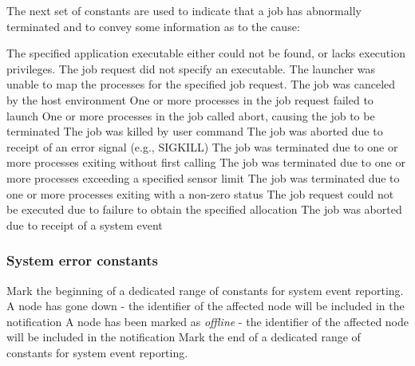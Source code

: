 The next set of constants are used to indicate that a job has abnormally terminated and to convey some information as to the cause:

\begin{constantdesc}

%
The specified application executable either could not be found, or lacks execution privileges.
%
The job request did not specify an executable.
%
The launcher was unable to map the processes for the specified job request.
%
The job was canceled by the host environment
%
One or more processes in the job request failed to launch
%
One or more processes in the job called abort, causing the job to be terminated
%
The job was killed by user command
%
The job was aborted due to receipt of an error signal (e.g., SIGKILL)
%
The job was terminated due to one or more processes exiting without first calling 
%
The job was terminated due to one or more processes exceeding a specified sensor limit
%
The job was terminated due to one or more processes exiting with a non-zero status
%
The job request could not be executed due to failure to obtain the specified allocation
%
The job was aborted due to receipt of a system event

\end{constantdesc}


\subsubsection{System error constants}
\label{api:struct:syserrors}

\begin{constantdesc}
%
Mark the beginning of a dedicated range of constants for system event reporting.
%
A node has gone down - the identifier of the affected node will be included in the notification
%
A node has been marked as \emph{offline} - the identifier of the affected node will be included in the notification
%
Mark the end of a dedicated range of constants for system event reporting.
\end{constantdesc}
%

